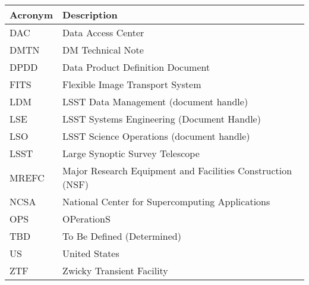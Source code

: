 \addtocounter{table}{-1}
\begin{longtable}{|l|p{}|}\hline
\textbf{Acronym} & \textbf{Description}  \\\hline

DAC & Data Access Center \\\hline
DMTN & DM Technical Note \\\hline
DPDD & Data Product Definition Document \\\hline
FITS & Flexible Image Transport System \\\hline
LDM & LSST Data Management (document handle) \\\hline
LSE & LSST Systems Engineering (Document Handle) \\\hline
LSO & LSST Science Operations (document handle) \\\hline
LSST & Large Synoptic Survey Telescope \\\hline
MREFC & Major Research Equipment and Facilities Construction (NSF) \\\hline
NCSA & National Center for Supercomputing Applications \\\hline
OPS & OPerationS \\\hline
TBD & To Be Defined (Determined) \\\hline
US & United States \\\hline
ZTF & Zwicky Transient Facility \\\hline
\end{longtable}
